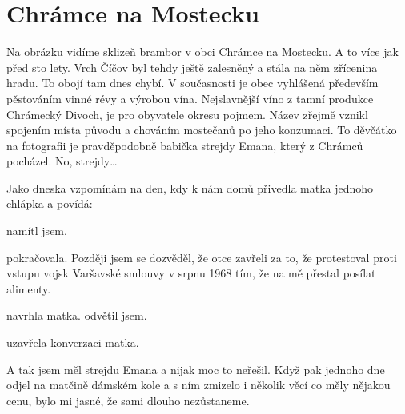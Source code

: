 
\chapter{Chrámce na Mostecku}

Na obrázku vidíme sklizeň brambor v obci Chrámce na Mostecku. A to více jak
před sto lety. Vrch Číčov byl tehdy ještě zalesněný a stála na něm zřícenina
hradu. To obojí tam dnes chybí. V současnosti je obec vyhlášená především
pěstováním vinné révy a výrobou vína. Nejslavnější víno z tamní produkce
Chrámecký Divoch, je pro obyvatele okresu pojmem. Název zřejmě vznikl spojením
místa původu a chováním mostečanů po jeho konzumaci. To děvčátko na fotografii
je pravděpodobně babička strejdy Emana, který z Chrámců pocházel. No,
strejdy\dots

Jako dneska vzpomínám na den, kdy k nám domů přivedla matka jednoho chlápka a
povídá: 

 namítl jsem.

pokračovala. Později jsem se dozvěděl, že otce zavřeli za to, že
protestoval proti vstupu vojsk Varšavské smlouvy v srpnu 1968 tím, že na mě
přestal posílat alimenty.

 navrhla matka.  odvětil jsem.

 uzavřela konverzaci matka.

A tak jsem měl strejdu Emana a nijak moc to neřešil. Když pak jednoho dne odjel
na matčině dámském kole a s ním zmizelo i několik věcí co měly nějakou cenu,
bylo mi jasné, že sami dlouho nezůstaneme.
